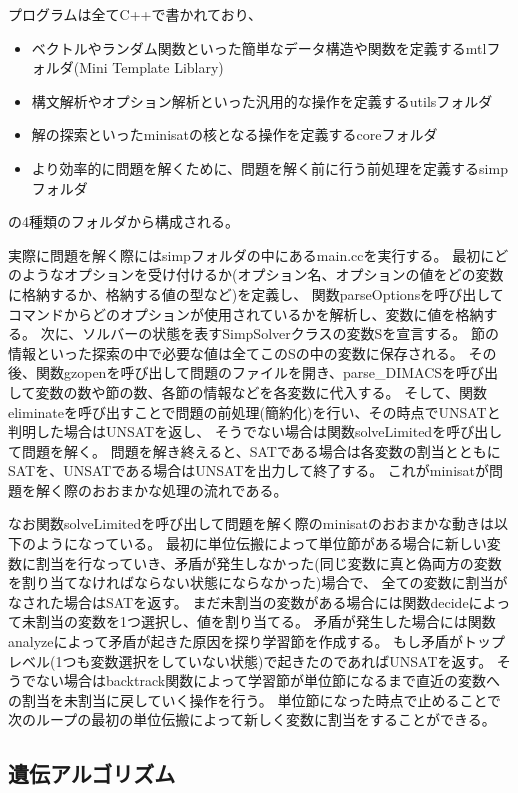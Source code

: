 プログラムは全てC++で書かれており、
\begin{itemize}
	\item ベクトルやランダム関数といった簡単なデータ構造や関数を定義するmtlフォルダ(Mini Template Liblary)
	\item 構文解析やオプション解析といった汎用的な操作を定義するutilsフォルダ
	\item 解の探索といったminisatの核となる操作を定義するcoreフォルダ
	\item より効率的に問題を解くために、問題を解く前に行う前処理を定義するsimpフォルダ
\end{itemize}
の4種類のフォルダから構成される。

実際に問題を解く際にはsimpフォルダの中にあるmain.ccを実行する。
最初にどのようなオプションを受け付けるか(オプション名、オプションの値をどの変数に格納するか、格納する値の型など)を定義し、
関数parseOptionsを呼び出してコマンドからどのオプションが使用されているかを解析し、変数に値を格納する。
次に、ソルバーの状態を表すSimpSolverクラスの変数Sを宣言する。
節の情報といった探索の中で必要な値は全てこのSの中の変数に保存される。
その後、関数gzopenを呼び出して問題のファイルを開き、parse\_DIMACSを呼び出して変数の数や節の数、各節の情報などを各変数に代入する。
そして、関数eliminateを呼び出すことで問題の前処理(簡約化)を行い、その時点でUNSATと判明した場合はUNSATを返し、
そうでない場合は関数solveLimitedを呼び出して問題を解く。
問題を解き終えると、SATである場合は各変数の割当とともにSATを、UNSATである場合はUNSATを出力して終了する。
これがminisatが問題を解く際のおおまかな処理の流れである。

なお関数solveLimitedを呼び出して問題を解く際のminisatのおおまかな動きは以下のようになっている。
最初に単位伝搬によって単位節がある場合に新しい変数に割当を行なっていき、矛盾が発生しなかった(同じ変数に真と偽両方の変数を割り当てなければならない状態にならなかった)場合で、
全ての変数に割当がなされた場合はSATを返す。
まだ未割当の変数がある場合には関数decideによって未割当の変数を1つ選択し、値を割り当てる。
矛盾が発生した場合には関数analyzeによって矛盾が起きた原因を探り学習節を作成する。
もし矛盾がトップレベル(1つも変数選択をしていない状態)で起きたのであればUNSATを返す。
そうでない場合はbacktrack関数によって学習節が単位節になるまで直近の変数への割当を未割当に戻していく操作を行う。
単位節になった時点で止めることで次のループの最初の単位伝搬によって新しく変数に割当をすることができる。





\subsection{遺伝アルゴリズム}



